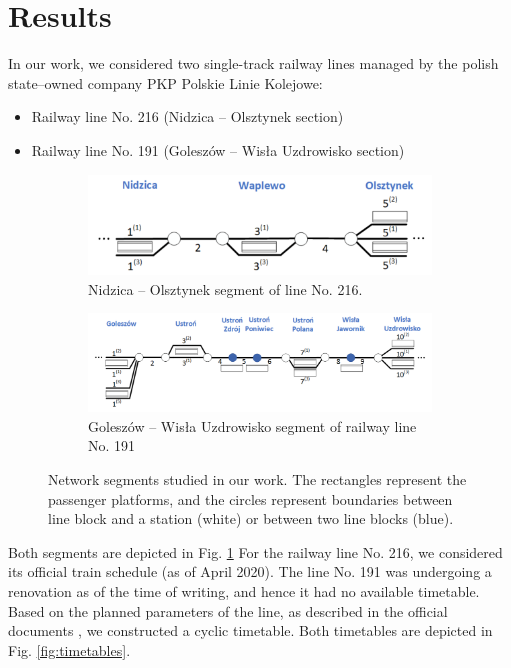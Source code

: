 \section{Results}
In our work, we considered two single-track railway lines managed by the polish state--owned
company PKP Polskie Linie Kolejowe:

\begin{itemize}
	\item Railway line No. 216 (Nidzica -- Olsztynek section)
	\item Railway line No. 191 (Goleszów -- Wisła Uzdrowisko section)
\end{itemize}


\begin{figure}
  \begin{subfigure}[a]{\textwidth}
    \includegraphics[width=\textwidth]{figures/line_small.pdf}
    \caption{ Nidzica -- Olsztynek segment of line No. 216.}
  \end{subfigure}
  \begin{subfigure}[b]{\textwidth}
    \includegraphics[width=\textwidth]{figures/line.pdf}
    \caption{Goleszów -- Wisła Uzdrowisko segment of railway line No. 191}
  \end{subfigure}
  \caption{
    Network segments studied in our work. The rectangles represent the passenger platforms,
    and the circles represent boundaries between line block and a station (white) or between
    two line blocks (blue).
  }
  \label{fig:railway-network}
\end{figure}

Both segments are depicted in Fig. \ref{fig:railway-network}
For the railway line No. 216, we considered its official train schedule (as of April 2020). The
line No. 191 was undergoing a renovation as of the time of writing, and hence it had no
available timetable. Based on the planned parameters of the line, as described in the official
documents \cite{}, we constructed a cyclic timetable. Both timetables are depicted in Fig.
\ref{fig:timetables}.

